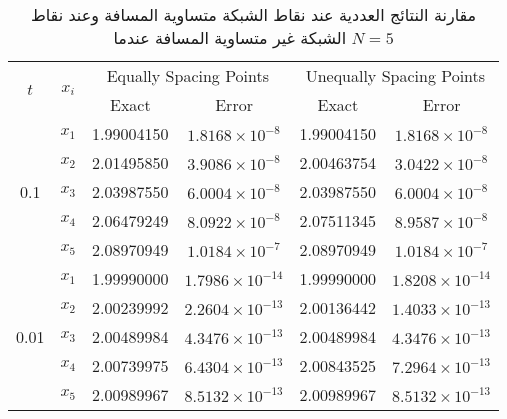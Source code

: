 \begin{example}
	\begin{table}[H]
		\renewcommand{\arraystretch}{1.5}
		\centering
		\begin{english}
\begin{tabular}{|c|c|c|c|c|c|}
			\hline
			\multirow{2}{*}{\( t \)} & \multirow{2}{*}{\( x_i \)} & \multicolumn{2}{c|}{Equally Spacing Points} & \multicolumn{2}{c|}{Unequally Spacing Points} \\
			\cline{3-6}
			& & Exact & Error & Exact & Error \\
			\hline
			\multirow{5}{*}{0.1} & \( x_1 \) & 1.99004150 & \( 1.8168 \times 10^{-8} \) & 1.99004150 & \( 1.8168 \times 10^{-8} \) \\
			& \( x_2 \) & 2.01495850 & \( 3.9086 \times 10^{-8} \) & 2.00463754 & \( 3.0422 \times 10^{-8} \) \\
			& \( x_3 \) & 2.03987550 & \( 6.0004 \times 10^{-8} \) & 2.03987550 & \( 6.0004 \times 10^{-8} \) \\
			& \( x_4 \) & 2.06479249 & \( 8.0922 \times 10^{-8} \) & 2.07511345 & \( 8.9587 \times 10^{-8} \) \\
			& \( x_5 \) & 2.08970949 & \( 1.0184 \times 10^{-7} \) & 2.08970949 & \( 1.0184 \times 10^{-7} \) \\
			\hline
			\multirow{5}{*}{0.01} & \( x_1 \) & 1.99990000 & \( 1.7986 \times 10^{-14} \) & 1.99990000 & \( 1.8208 \times 10^{-14} \) \\
			& \( x_2 \) & 2.00239992 & \( 2.2604 \times 10^{-13} \) & 2.00136442 & \( 1.4033 \times 10^{-13} \) \\
			& \( x_3 \) & 2.00489984 & \( 4.3476 \times 10^{-13} \) & 2.00489984 & \( 4.3476 \times 10^{-13} \) \\
			& \( x_4 \) & 2.00739975 & \( 6.4304 \times 10^{-13} \) & 2.00843525 & \( 7.2964 \times 10^{-13} \) \\
			& \( x_5 \) & 2.00989967 & \( 8.5132 \times 10^{-13} \) & 2.00989967 & \( 8.5132 \times 10^{-13} \) \\
			\hline
		\end{tabular}
\end{english}
	\caption{\centering مقارنة النتائج العددية عند نقاط الشبكة متساوية المسافة وعند نقاط الشبكة غير متساوية المسافة عندما $N=5$}
\label{tab:secondN5}
\end{table}
	

\end{example}
